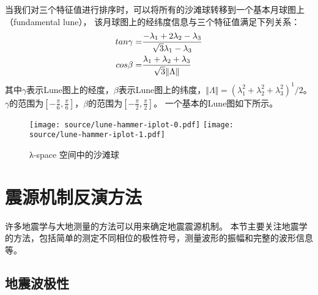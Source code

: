 当我们对三个特征值进行排序时，可以将所有的沙滩球转移到一个基本月球图上（fundamental lune），
该月球图上的经纬度信息与三个特征值满足下列关系：
\begin{align}
    tan \gamma = & \frac{- \lambda_1 + 2\lambda_2 - \lambda_3 }{\sqrt{3} \lambda_1 - \lambda_3}  \notag \\
    cos \beta = & \frac{\lambda_1 + \lambda_2 + \lambda_3}{\sqrt{3}  \Vert \Lambda \Vert }
\end{align}
其中$\gamma$表示Lune图上的经度，$\beta$表示Lune图上的纬度，$\Vert \Lambda \Vert = {(\lambda_1^2 + \lambda_2^2 + \lambda_3^2 )}^1/2$。
$\gamma$的范围为$[-\frac{\pi}{6},\frac{\pi}{6}]$，$\beta$的范围为$[-\frac{\pi}{2},\frac{\pi}{2}]$。
一个基本的Lune图如下所示。
\begin{figure}[h]
    \centering
    \texttt{[image: source/lune-hammer-iplot-0.pdf]}
    \texttt{[image: source/lune-hammer-iplot-1.pdf]}
    \caption{λ-space 空间中的沙滩球}
    \label{fig:lune-hammer}
\end{figure}


\section{震源机制反演方法}
许多地震学与大地测量的方法可以用来确定地震震源机制。
本节主要关注地震学的方法，包括简单的测定不同相位的极性符号，测量波形的振幅和完整的波形信息等。

\subsection{地震波极性}






